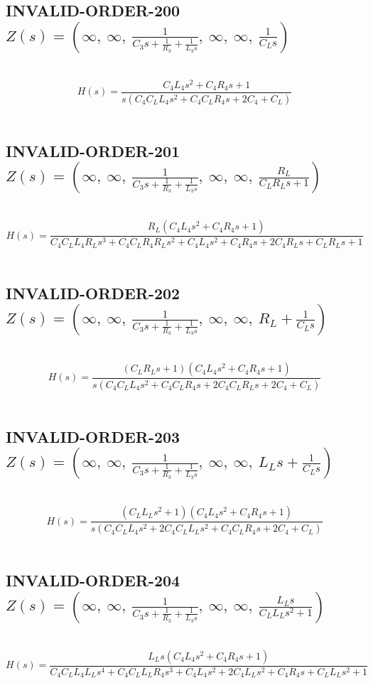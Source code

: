 \documentclass{article}
\begin{document}
\subsection{INVALID-ORDER-200 $Z(s) = \left( \infty, \  \infty, \  \frac{1}{C_{3} s + \frac{1}{R_{3}} + \frac{1}{L_{3} s}}, \  \infty, \  \infty, \  \frac{1}{C_{L} s}\right)$ } \ 
\textbf{\[H(s) = \frac{C_{4} L_{4} s^{2} + C_{4} R_{4} s + 1}{s \left(C_{4} C_{L} L_{4} s^{2} + C_{4} C_{L} R_{4} s + 2 C_{4} + C_{L}\right)}\] } \ 
\subsection{INVALID-ORDER-201 $Z(s) = \left( \infty, \  \infty, \  \frac{1}{C_{3} s + \frac{1}{R_{3}} + \frac{1}{L_{3} s}}, \  \infty, \  \infty, \  \frac{R_{L}}{C_{L} R_{L} s + 1}\right)$ } \ 
\textbf{\[H(s) = \frac{R_{L} \left(C_{4} L_{4} s^{2} + C_{4} R_{4} s + 1\right)}{C_{4} C_{L} L_{4} R_{L} s^{3} + C_{4} C_{L} R_{4} R_{L} s^{2} + C_{4} L_{4} s^{2} + C_{4} R_{4} s + 2 C_{4} R_{L} s + C_{L} R_{L} s + 1}\] } \ 
\subsection{INVALID-ORDER-202 $Z(s) = \left( \infty, \  \infty, \  \frac{1}{C_{3} s + \frac{1}{R_{3}} + \frac{1}{L_{3} s}}, \  \infty, \  \infty, \  R_{L} + \frac{1}{C_{L} s}\right)$ } \ 
\textbf{\[H(s) = \frac{\left(C_{L} R_{L} s + 1\right) \left(C_{4} L_{4} s^{2} + C_{4} R_{4} s + 1\right)}{s \left(C_{4} C_{L} L_{4} s^{2} + C_{4} C_{L} R_{4} s + 2 C_{4} C_{L} R_{L} s + 2 C_{4} + C_{L}\right)}\] } \ 
\subsection{INVALID-ORDER-203 $Z(s) = \left( \infty, \  \infty, \  \frac{1}{C_{3} s + \frac{1}{R_{3}} + \frac{1}{L_{3} s}}, \  \infty, \  \infty, \  L_{L} s + \frac{1}{C_{L} s}\right)$ } \ 
\textbf{\[H(s) = \frac{\left(C_{L} L_{L} s^{2} + 1\right) \left(C_{4} L_{4} s^{2} + C_{4} R_{4} s + 1\right)}{s \left(C_{4} C_{L} L_{4} s^{2} + 2 C_{4} C_{L} L_{L} s^{2} + C_{4} C_{L} R_{4} s + 2 C_{4} + C_{L}\right)}\] } \ 
\subsection{INVALID-ORDER-204 $Z(s) = \left( \infty, \  \infty, \  \frac{1}{C_{3} s + \frac{1}{R_{3}} + \frac{1}{L_{3} s}}, \  \infty, \  \infty, \  \frac{L_{L} s}{C_{L} L_{L} s^{2} + 1}\right)$ } \ 
\textbf{\[H(s) = \frac{L_{L} s \left(C_{4} L_{4} s^{2} + C_{4} R_{4} s + 1\right)}{C_{4} C_{L} L_{4} L_{L} s^{4} + C_{4} C_{L} L_{L} R_{4} s^{3} + C_{4} L_{4} s^{2} + 2 C_{4} L_{L} s^{2} + C_{4} R_{4} s + C_{L} L_{L} s^{2} + 1}\] } \ 
\end{document}
